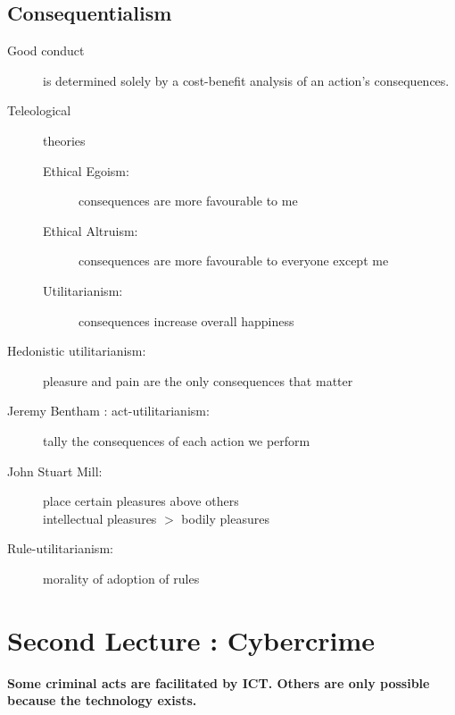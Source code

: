 \documentclass[a4paper]{article}
\begin{document}
\subsection*{Consequentialism}

\begin{description}
\item[Good conduct] is determined solely by a cost-benefit analysis of an action's consequences.
\item[Teleological] theories
\begin{description}
\item[Ethical Egoism:] consequences are more favourable to me
\item[Ethical Altruism:] consequences are more favourable to everyone except me
\item[Utilitarianism:] consequences increase overall happiness
\end{description}
\item[Hedonistic utilitarianism:] pleasure and pain are the only consequences that matter
\item[Jeremy Bentham : act-utilitarianism:] tally the consequences of each action we perform
\item[John Stuart Mill:] place certain pleasures above others \\ intellectual pleasures $>$ bodily pleasures
\item[Rule-utilitarianism:] morality of adoption of rules
\end{description}

\section{Second Lecture : Cybercrime}

\textbf{Some criminal acts are facilitated by ICT. Others are only possible because the technology exists.}
\end{document}
